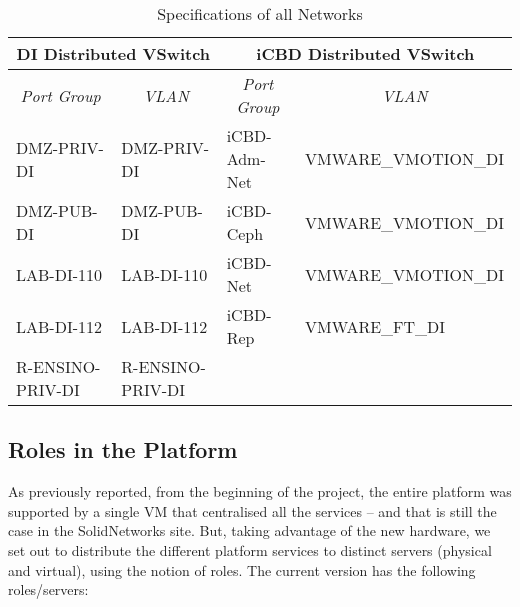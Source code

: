 \begin{table}[]
\centering
\begin{tabular}{ll|ll}
\multicolumn{2}{c|}{\textbf{DI Distributed VSwitch}} & \multicolumn{2}{c}{\textbf{iCBD Distributed VSwitch}} \\ \hline
\multicolumn{1}{c}{\textit{Port Group}} & \multicolumn{1}{c|}{\textit{VLAN}} & \multicolumn{1}{c}{\textit{Port Group}} & \multicolumn{1}{c}{\textit{VLAN}} \\
DMZ-PRIV-DI & DMZ-PRIV-DI & iCBD-Adm-Net & VMWARE\_VMOTION\_DI \\
DMZ-PUB-DI & DMZ-PUB-DI & iCBD-Ceph & VMWARE\_VMOTION\_DI \\
LAB-DI-110 & LAB-DI-110 & iCBD-Net & VMWARE\_VMOTION\_DI \\
LAB-DI-112 & LAB-DI-112 & iCBD-Rep & VMWARE\_FT\_DI \\
R-ENSINO-PRIV-DI & R-ENSINO-PRIV-DI &  & 
\end{tabular}
\caption{Specifications of all Networks}
\label{tab:impl_dvs}
\end{table}


\subsection{Roles in the Platform}
\label{sub:impl_roles}


As previously reported, from the beginning of the project, the entire platform was supported by a single VM that centralised all the services – and that is still the case in the SolidNetworks site. But, taking advantage of the new hardware, we set out to distribute the different platform services to distinct servers (physical and virtual), using the notion of roles. The current version has the following roles/servers:

